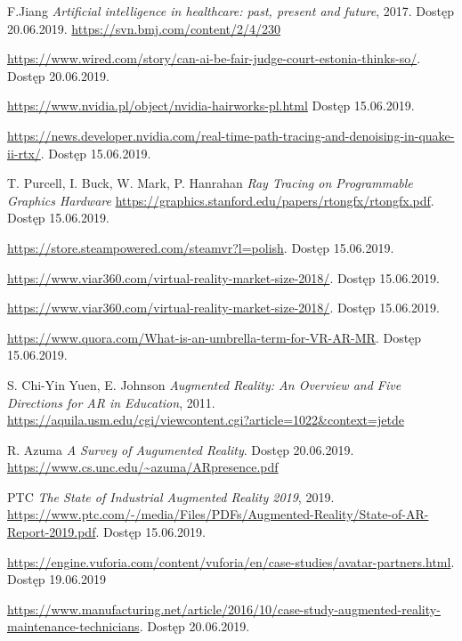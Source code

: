 \documentclass[12pt,twoside,polish]{article}
\begin{document}
\begin{thebibliography}{11}
F.Jiang \emph{Artificial intelligence in healthcare: past, present and future}, 2017. Dostęp 20.06.2019.
\url{https://svn.bmj.com/content/2/4/230}

\url{https://www.wired.com/story/can-ai-be-fair-judge-court-estonia-thinks-so/}. Dostęp 20.06.2019.

\url{https://www.nvidia.pl/object/nvidia-hairworks-pl.html} Dostęp 15.06.2019.

\url{https://news.developer.nvidia.com/real-time-path-tracing-and-denoising-in-quake-ii-rtx/}. Dostęp 15.06.2019.

T. Purcell, I. Buck, W. Mark, P. Hanrahan \emph{Ray Tracing on Programmable Graphics Hardware}
\url{https://graphics.stanford.edu/papers/rtongfx/rtongfx.pdf}. Dostęp 15.06.2019.

\url{https://store.steampowered.com/steamvr?l=polish}. Dostęp 15.06.2019. 

\url{https://www.viar360.com/virtual-reality-market-size-2018/}. Dostęp 15.06.2019.

\url{https://www.viar360.com/virtual-reality-market-size-2018/}. Dostęp 15.06.2019. 

\url{https://www.quora.com/What-is-an-umbrella-term-for-VR-AR-MR}. Dostęp 15.06.2019.

S. Chi-Yin Yuen, E. Johnson \emph{Augmented Reality: An Overview and Five Directions for AR in Education}, 2011.
\url{https://aquila.usm.edu/cgi/viewcontent.cgi?article=1022&context=jetde}

R. Azuma \emph{A Survey of Augumented Reality}. Dostęp 20.06.2019.
\url{https://www.cs.unc.edu/~azuma/ARpresence.pdf}

PTC \emph{The State of Industrial Augmented Reality 2019}, 2019.
\url{https://www.ptc.com/-/media/Files/PDFs/Augmented-Reality/State-of-AR-Report-2019.pdf}. Dostęp 15.06.2019.

\url{https://engine.vuforia.com/content/vuforia/en/case-studies/avatar-partners.html}. Dostęp 19.06.2019

\url{https://www.manufacturing.net/article/2016/10/case-study-augmented-reality-maintenance-technicians}. Dostęp 20.06.2019.


\end{thebibliography}
\end{document}
